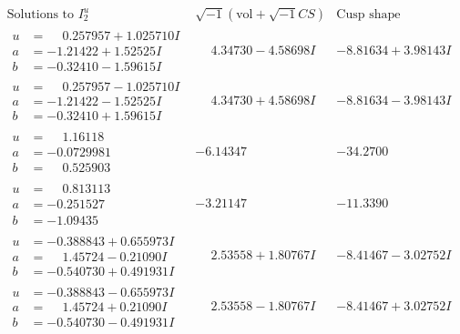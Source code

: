 \documentclass[1p]{elsarticle_modified}
\theoremstyle{definition}
\newcommand{\I}{\sqrt{-1}}
\begin{document}
$$\begin{array}{c|c|c}  
\text{Solutions to }I^u_{2}& \I (\text{vol} + \sqrt{-1}CS) & \text{Cusp shape}\\
 \hline 
\begin{aligned}
u &= \phantom{-}0.257957 + 1.025710 I \\
a &= -1.21422 + 1.52525 I \\
b &= -0.32410 - 1.59615 I\end{aligned}
 & \phantom{-}4.34730 - 4.58698 I & -8.81634 + 3.98143 I \\ \hline\begin{aligned}
u &= \phantom{-}0.257957 - 1.025710 I \\
a &= -1.21422 - 1.52525 I \\
b &= -0.32410 + 1.59615 I\end{aligned}
 & \phantom{-}4.34730 + 4.58698 I & -8.81634 - 3.98143 I \\ \hline\begin{aligned}
u &= \phantom{-}1.16118\phantom{ +0.000000I} \\
a &= -0.0729981\phantom{ +0.000000I} \\
b &= \phantom{-}0.525903\phantom{ +0.000000I}\end{aligned}
 & -6.14347\phantom{ +0.000000I} & -34.2700\phantom{ +0.000000I} \\ \hline\begin{aligned}
u &= \phantom{-}0.813113\phantom{ +0.000000I} \\
a &= -0.251527\phantom{ +0.000000I} \\
b &= -1.09435\phantom{ +0.000000I}\end{aligned}
 & -3.21147\phantom{ +0.000000I} & -11.3390\phantom{ +0.000000I} \\ \hline\begin{aligned}
u &= -0.388843 + 0.655973 I \\
a &= \phantom{-}1.45724 - 0.21090 I \\
b &= -0.540730 + 0.491931 I\end{aligned}
 & \phantom{-}2.53558 + 1.80767 I & -8.41467 - 3.02752 I \\ \hline\begin{aligned}
u &= -0.388843 - 0.655973 I \\
a &= \phantom{-}1.45724 + 0.21090 I \\
b &= -0.540730 - 0.491931 I\end{aligned}
 & \phantom{-}2.53558 - 1.80767 I & -8.41467 + 3.02752 I \\ \hline\begin{aligned}

\end{aligned}
\end{array}$$
\end{document}
